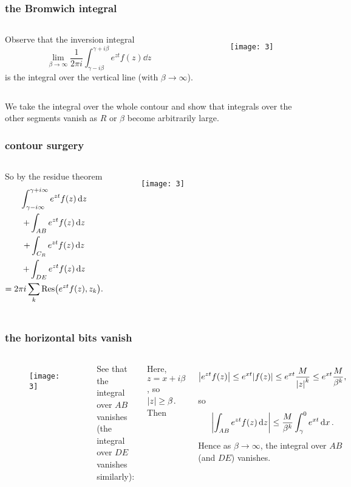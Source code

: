 \documentclass[mathserif]{beamer}
\begin{document}
\begin{frame}
  \frametitle{the Bromwich integral}

  \begin{columns}
  Observe that the inversion integral \[\lim_{\beta \to \infty}\frac{1}{2\pi i}\int_{\gamma - i\beta}^{\gamma + i\beta}e^{zt}f(z)\dd{z}\] is the integral over the vertical line (with $\beta\to \infty$).
    \begin{figure}[h]
      \centering
      \texttt{[image: 3]}
    \end{figure}
  \end{columns}

  \pause We take the integral over the whole contour and show that integrals over the other segments vanish as $R$ or $\beta$ become arbitrarily large.

\end{frame}

\begin{frame}
  \frametitle{contour surgery}
  \begin{columns}
    So by the residue theorem \begin{multline*}
      \int_{\gamma-i\infty}^{\gamma+i\infty} e^{zt}f(z)\dd{z}\\ + \int_{AB} e^{zt}f(z)\dd{z}\\ + \int_{C_R} e^{zt}f(z)\dd{z}\\ + \int_{DE} e^{zt}f(z)\dd{z}\\ = 2\pi i\sum_k \Res(e^{zt}f(z), z_k).
    \end{multline*}
      \begin{figure}[h]
        \centering
        \texttt{[image: 3]}
      \end{figure}
    \end{columns}
  

\end{frame}

\begin{frame}
  \frametitle{the horizontal bits vanish}

  \begin{columns}
      \begin{figure}[h]
        \centering
        \texttt{[image: 3]}
      \end{figure}
    See that the integral over $AB$ vanishes (the integral over $DE$ vanishes similarly):

  \pause Here, $z=x+i\beta$, so $\abs{z}\geq\beta$. Then

  \pause \[\abs{e^{zt}f(z)} \leq e^{xt}\abs{f(z)}\leq e^{xt}\frac{M}{\abs{z}^k} \leq e^{xt}\frac{M}{\beta^k},\] \pause so \[\abs{\int_{AB} e^{zt}f(z)\dd{z}}\leq \frac{M}{\beta^k}\int_{\gamma}^0e^{xt}\dd{x}.\] Hence as $\beta\to\infty$, the integral over $AB$ (and $DE$) vanishes.
    
    \end{columns}
  
\end{frame}
\end{document}
